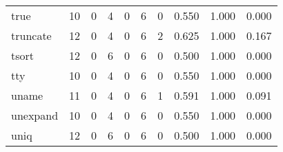 \begin{longtable}{lp{2.0cm}p{2.0cm}p{2.0cm}p{2.0cm}p{2.0cm}p{2.0cm}p{2.0cm}p{2.0cm}p{2.0cm}}
true      &                     10 &                                             0 &                                            4 &                                           0 &                                            6 &                                          0 &                                0.550 &                                  1.000 &                                0.000 \\
truncate  &                     12 &                                             0 &                                            4 &                                           0 &                                            6 &                                          2 &                                0.625 &                                  1.000 &                                0.167 \\
tsort     &                     12 &                                             0 &                                            6 &                                           0 &                                            6 &                                          0 &                                0.500 &                                  1.000 &                                0.000 \\
tty       &                     10 &                                             0 &                                            4 &                                           0 &                                            6 &                                          0 &                                0.550 &                                  1.000 &                                0.000 \\
uname     &                     11 &                                             0 &                                            4 &                                           0 &                                            6 &                                          1 &                                0.591 &                                  1.000 &                                0.091 \\
unexpand  &                     10 &                                             0 &                                            4 &                                           0 &                                            6 &                                          0 &                                0.550 &                                  1.000 &                                0.000 \\
uniq      &                     12 &                                             0 &                                            6 &                                           0 &                                            6 &                                          0 &                                0.500 &                                  1.000 &                                0.000 \\

\end{longtable}
